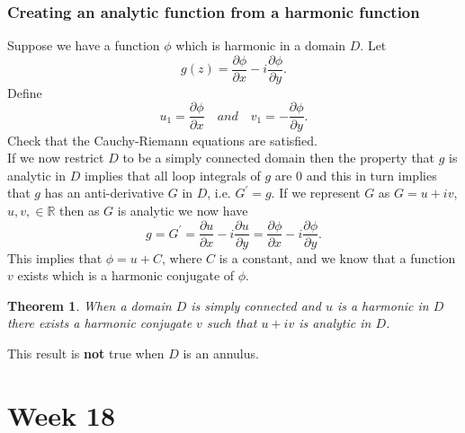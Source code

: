 \documentclass{article}
\newtheorem{theorem}{Theorem}
\begin{document}
\subsubsection{Creating an analytic function from a harmonic function}
Suppose we have a function $\phi$ which is harmonic in a domain $D$. Let
\begin{equation}
    g(z) = \frac{\partial \phi}{\partial x} -i\frac{\partial \phi}{\partial y}.\nonumber
\end{equation}
Define
\begin{equation}
    u_1 = \frac{\partial \phi}{\partial x}\quad and \quad v_1 = -\frac{\partial \phi}{\partial y}.
\end{equation}
Check that the Cauchy-Riemann equations are satisfied.\\
If we now restrict $D$ to be a simply connected domain then the property that $g$ is analytic in $D$ implies that all loop integrals of $g$ are $0$ and this in turn implies that $g$ has an anti-derivative $G$ in $D$, i.e. $G^\prime = g$. If we represent $G$ as $G=u+iv$, $u,v,\in\mathbb{R}$ then as $G$ is analytic we now have
\begin{equation}
    g = G^\prime = \frac{\partial u}{\partial x}-i\frac{\partial u}{\partial y} = \frac{\partial \phi}{\partial x} - i\frac{\partial \phi}{\partial y}.
\end{equation}
This implies that $\phi = u+C$, where $C$ is a constant, and we know that a function $v$ exists which is a harmonic conjugate of $\phi$.
\begin{theorem}
    When a domain $D$ is simply connected and $u$ is a harmonic in $D$ there exists a harmonic conjugate $v$ such that $u+iv$ is analytic in $D$.    
\end{theorem}
This result is \textbf{not} true when $D$ is an annulus.



\section{Week 18}
\end{document}
